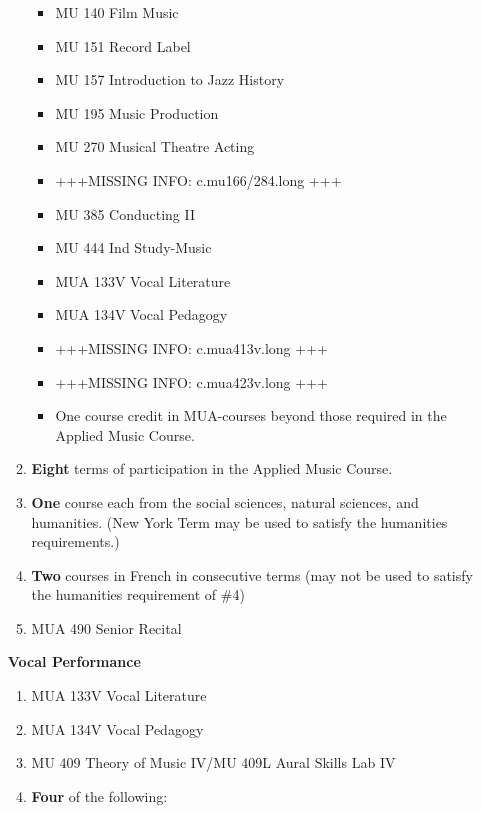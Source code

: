 \documentclass[
  letterpaper,
]{scrbook}
\providecommand{\tightlist}{%
  \setlength{\itemsep}{0pt}\setlength{\parskip}{0pt}}
\begin{document}
\begin{enumerate}
\begin{enumerate}
    \begin{itemize}
    \tightlist
    \item
      MU 140 Film Music
    \item
      MU 151 Record Label
    \item
      MU 157 Introduction to Jazz History
    \item
      MU 195 Music Production
    \item
      MU 270 Musical Theatre Acting
    \item
      +++MISSING INFO: c.mu166/284.long +++
    \item
      MU 385 Conducting II
    \item
      MU 444 Ind Study-Music
    \item
      MUA 133V Vocal Literature
    \item
      MUA 134V Vocal Pedagogy
    \item
      +++MISSING INFO: c.mua413v.long +++
    \item
      +++MISSING INFO: c.mua423v.long +++
    \item
      One course credit in MUA-courses beyond those required in the
      Applied Music Course.
    \end{itemize}
  \item
    \textbf{Eight} terms of participation in the Applied Music Course.
  \item
    \textbf{One} course each from the social sciences, natural sciences,
    and humanities. (New York Term may be used to satisfy the humanities
    requirements.)
  \item
    \textbf{Two} courses in French in consecutive terms (may not be used
    to satisfy the humanities requirement of \#4)
  \item
    MUA 490 Senior Recital
  \end{enumerate}

  \textbf{Vocal Performance}

  \begin{enumerate}
  \def\labelenumii{\arabic{enumii}.}
  \tightlist
  \item
    MUA 133V Vocal Literature
  \item
    MUA 134V Vocal Pedagogy
  \item
    MU 409 Theory of Music IV/MU 409L Aural Skills Lab IV
  \item
    \textbf{Four} of the following:


\end{enumerate}
\end{enumerate}
\end{document}
